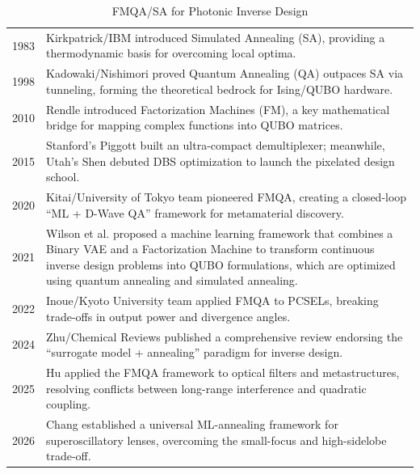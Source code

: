 \begin{table}[H] 
\centering
\begin{tabularx}{\textwidth}{l | >{\linespread{1.0}\selectfont\arraybackslash}X}
\hline \rule{0pt}{1.8em}1983 & Kirkpatrick/IBM introduced Simulated Annealing (SA), providing a thermodynamic basis for overcoming local optima.\cite{kirkpatrick1983_simulated_annealing} \\[1.5em]

1998 & Kadowaki/Nishimori proved Quantum Annealing (QA) outpaces SA via tunneling, forming the theoretical bedrock for Ising/QUBO hardware.\cite{kadowaki1998_quantum_annealing} \\[1.5em]

2010 & Rendle introduced Factorization Machines (FM), a key mathematical bridge for mapping complex functions into QUBO matrices.\cite{rendle2010_factorization} \\[1.5em]

2015 & Stanford's Piggott built an ultra-compact demultiplexer; meanwhile, Utah's Shen debuted DBS optimization to launch the pixelated design school.\cite{piggott2015_inverse_design,shen2015_integrated_pbs} \\[1.5em]

2020 & Kitai/University of Tokyo team pioneered FMQA, creating a closed-loop ``ML + D-Wave QA'' framework for metamaterial discovery.\cite{kitai2020_fmqa} \\[1.5em]

2021 & Wilson et al. proposed a machine learning framework that combines a Binary VAE and a Factorization Machine to transform continuous inverse design problems into QUBO formulations, which are optimized using quantum annealing and simulated annealing.\cite{Wilson_2021} \\[1.5em]

2022 & Inoue/Kyoto University team applied FMQA to PCSELs, breaking trade-offs in output power and divergence angles.\cite{inoue2022_fmqa_pcsel} \\[1.5em]

2024 & Zhu/Chemical Reviews published a comprehensive review endorsing the ``surrogate model + annealing'' paradigm for inverse design.\cite{zhu2024_machine_learning} \\[1.5em]

2025 & Hu applied the FMQA framework to optical filters and metastructures, resolving conflicts between long-range interference and quadratic coupling.\cite{hu2025_optical_filter} \\[1.5em]

2026 & Chang established a universal ML-annealing framework for superoscillatory lenses, overcoming the small-focus and high-sidelobe trade-off.\cite{chang2026_quantum_compatible} \\
\hline
\end{tabularx}
\caption{FMQA/SA for Photonic Inverse Design}
\label{tab:fmqa_sa}
\end{table}
\clearpage

